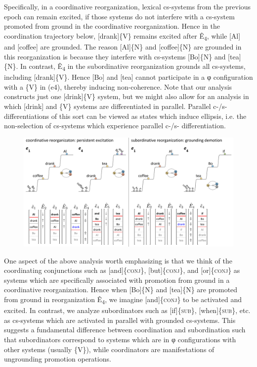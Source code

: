   Specifically, in a coordinative reorganization, lexical cs-systems from the previous epoch can remain excited, if those systems do not interfere with a cs-system promoted from ground in the coordinative reorganization. Hence in the coordination trajectory below, [drank]\{V\} remains excited after Ê\textsubscript{4}, while [Al] and [coffee] are grounded. The reason [Al]\{N\} and [coffee]\{N\} are grounded in this reorganization is because they interfere with cs-systems [Bo]\{N\} and [tea]\{N\}. In contrast, Ê\textsubscript{4} in the subordinative reorganization grounds all cs-systems, including [drank]\{V\}. Hence [Bo] and [tea] cannot participate in a φ configuration with a \{V\} in (e4), thereby inducing non-coherence. Note that our analysis constructs just one [drink]\{V\} system, but we might also allow for an analysis in which [drink] and \{V\} systems are differentiated in parallel. Parallel c-/s- differentiations of this sort can be viewed as states which induce ellipsis, i.e. the non-selection of cs-systems which experience parallel c-/s- differentiation.

  
\begin{figure}
\includegraphics[width=\textwidth]{figures/Tilsen-img146.png}
\caption{\missingcaption}
\label{fig:}
\end{figure}
 

  One aspect of the above analysis worth emphasizing is that we think of the coordinating conjunctions such as [and]\{\textsc{conj}\}, [but]\{\textsc{conj}\}, and [or]\{\textsc{conj}\} as systems which are specifically associated with promotion from ground in a coordinative reorganization. Hence when [Bo]\{N\} and [tea]\{N\} are promoted from ground in reorganization Ê\textsubscript{4}, we imagine [and]\{\textsc{conj}\} to be activated and excited. In contrast, we analyze subordinators such as [if]\{\textsc{sub}\}, [when]\{\textsc{sub}\}, etc. as cs-systems which are activated in parallel with grounded cs-systems. This suggests a fundamental difference between coordination and subordination such that subordinators correspond to systems which are in φ configurations with other systems (usually \{V\}), while coordinators are manifestations of ungrounding promotion operations.

